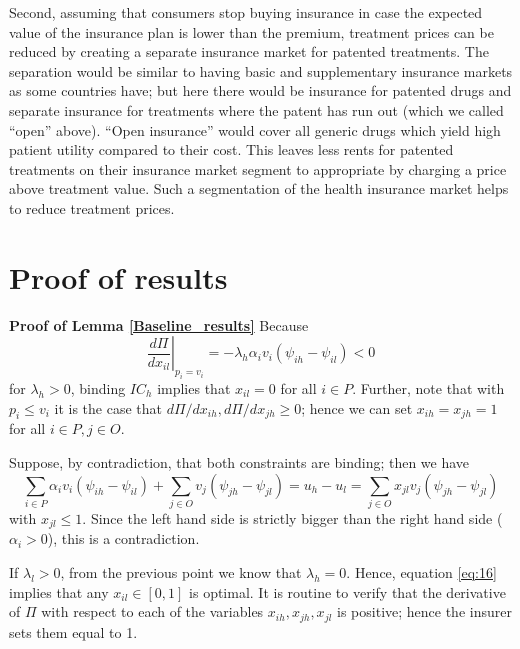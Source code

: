 \documentclass[a4paper,12pt]{article}
\begin{document}
Second, assuming that consumers stop buying insurance in case the expected value of the insurance plan is lower than the premium, treatment prices can be reduced by creating a separate insurance market for patented treatments. The separation would be similar to having basic and supplementary insurance markets as some countries have; but here there would be insurance for patented drugs and separate insurance for treatments  where the patent has run out (which we called ``open'' above). ``Open insurance'' would cover all generic drugs which yield high patient utility compared to their cost. This leaves less rents for patented treatments on their insurance market segment to appropriate by charging a price above treatment value. Such a segmentation of the health insurance market helps to reduce treatment prices.





\setcounter{table}{0}
\renewcommand{\thetable}{\thesection\arabic{table}}



\section{Proof of results}
\label{sec:orgd81983f}

\textbf{Proof of Lemma \ref{Baseline_results}}
Because
\begin{equation}
\label{eq:16}
\left. \frac{d\Pi}{d x_{il}}\right|_{p_i=v_i} = - \lambda_h \alpha_i v_i (\psi_{ih}-\psi_{il}) < 0
\end{equation}
for \(\lambda_h >0\), binding \(IC_h\) implies that \(x_{il} =0\) for all \(i \in P\). Further, note that with \(p_i \leq v_i\) it is the case that \(d \Pi/d x_{ih}, d \Pi/d x_{jh} \geq 0\); hence we can set \(x_{ih} = x_{jh} =1\) for all \(i \in P, j \in O\).

Suppose, by contradiction, that both constraints are binding; then we have
\begin{equation}
\label{eq:17}
 \sum_{i \in P} \alpha_i v_i (\psi_{ih}-\psi_{il}) + \sum_{j \in O} v_j (\psi_{jh}-\psi_{jl})  = u_h - u_l = \sum_{j \in O} x_{jl} v_j (\psi_{jh}-\psi_{jl})
\end{equation}
with \(x_{jl} \leq 1\). Since the left hand side is strictly bigger than the right hand side (\(\alpha_i > 0\)), this is a contradiction.

If \(\lambda_l >0\), from the previous point we know that \(\lambda_h = 0\). Hence, equation \eqref{eq:16} implies that any \(x_{il} \in [0,1]\) is optimal. It is routine to verify that the derivative of \(\Pi\) with respect to each of the variables \(x_{ih},x_{jh},x_{jl}\) is positive; hence the insurer sets them equal to 1.
\end{document}
